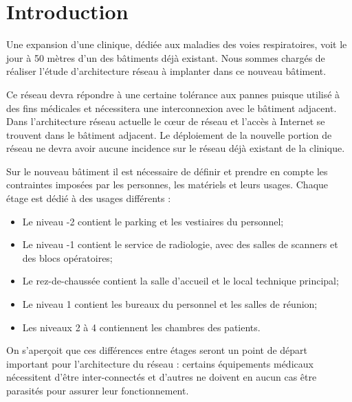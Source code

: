 \section*{Introduction} %

%
%

Une expansion d'une clinique, dédiée aux maladies des voies respiratoires, voit le jour à 50 mètres d'un des bâtiments déjà existant.
Nous sommes chargés de réaliser l'étude d'architecture réseau à implanter dans ce nouveau bâtiment.

%
%

Ce réseau devra répondre à une certaine tolérance aux pannes puisque utilisé à des fins médicales et nécessitera une interconnexion avec le bâtiment adjacent.
Dans l'architecture réseau actuelle le cœur de réseau et l'accès à Internet se trouvent dans le bâtiment adjacent.
Le déploiement de la nouvelle portion de réseau ne devra avoir aucune incidence sur le réseau déjà existant de la clinique.

%
%

Sur le nouveau bâtiment il est nécessaire de définir et prendre en compte les contraintes imposées par les personnes, les matériels et leurs usages.
Chaque étage est dédié à des usages différents :
\begin{itemize}
\item Le niveau -2 contient le parking et les vestiaires du personnel;
\item Le niveau -1 contient le service de radiologie, avec des salles de scanners et des blocs opératoires;
\item Le rez-de-chaussée contient la salle d'accueil et le local technique principal;
\item Le niveau 1 contient les bureaux du personnel et les salles de réunion;
\item Les niveaux 2 à 4 contiennent les chambres des patients.
\end{itemize}
On s'aperçoit que ces différences entre étages seront un point de départ important pour l'architecture du réseau :
certains équipements médicaux nécessitent d'être inter-connectés et d'autres ne doivent en aucun cas être parasités pour assurer leur fonctionnement.

%
%
